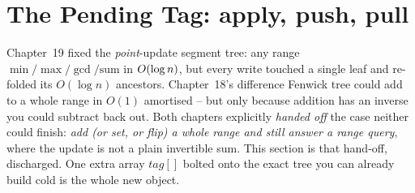 \section{The Pending Tag: apply, push, pull}\label{sec:c15-core}

\begin{previouslybox}
Chapter~19 fixed the \emph{point}-update segment tree: any range \(\min/\max/\gcd/\text{sum}\) in \(O(\log n)\), but every write touched a single leaf and re-folded its \(O(\log n)\) ancestors.  Chapter~18's difference Fenwick tree could add to a whole range in \(O(1)\) amortised -- but only because addition has an inverse you could subtract back out.  Both chapters explicitly \emph{handed off} the case neither could finish: \emph{add (or set, or flip) a whole range and still answer a range query}, where the update is not a plain invertible sum.  This section is that hand-off, discharged.  One extra array \(\mathit{tag}[]\) bolted onto the exact tree you can already build cold is the whole new object.
\end{previouslybox}

